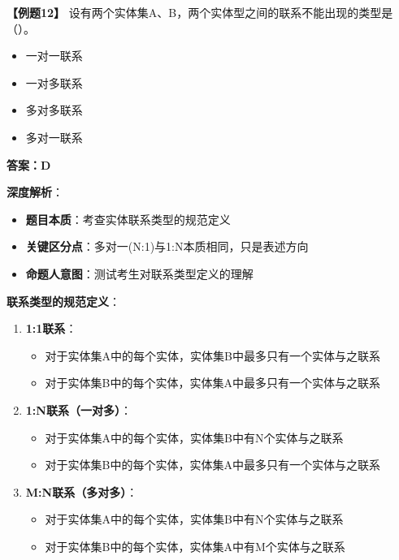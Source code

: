 \documentclass[12pt, a4paper]{article}
\newenvironment{bluebox}[1]{%
  \begin{trivlist}
  \item[\hskip\labelsep \textbf{#1}]
  \setlength{\parskip}{0.5ex}
  \setlength{\itemsep}{0.5ex}
}{%
  \end{trivlist}
  }
\begin{document}
\begin{bluebox}{例题12：不存在联系类型}
	\textbf{【例题12】} 设有两个实体集A、B，两个实体型之间的联系不能出现的类型是（\quad）。

	\begin{itemize}
		\item[A)] 一对一联系
		\item[B)] 一对多联系
		\item[C)] 多对多联系
		\item[D)] 多对一联系
	\end{itemize}

	\textbf{答案：D}

	\textbf{深度解析}：

	\begin{itemize}[leftmargin=*, nosep]
		\item \textbf{题目本质}：考查实体联系类型的规范定义
		\item \textbf{关键区分点}：多对一(N:1)与1:N本质相同，只是表述方向
		\item \textbf{命题人意图}：测试考生对联系类型定义的理解
	\end{itemize}

	\textbf{联系类型的规范定义}：

	\begin{enumerate}[leftmargin=*, nosep]
		\item \textbf{1:1联系}：
		      \begin{itemize}[nosep]
			      \item 对于实体集A中的每个实体，实体集B中最多只有一个实体与之联系
			      \item 对于实体集B中的每个实体，实体集A中最多只有一个实体与之联系
		      \end{itemize}

		\item \textbf{1:N联系（一对多）}：
		      \begin{itemize}[nosep]
			      \item 对于实体集A中的每个实体，实体集B中有N个实体与之联系
			      \item 对于实体集B中的每个实体，实体集A中最多只有一个实体与之联系
		      \end{itemize}

		\item \textbf{M:N联系（多对多）}：
		      \begin{itemize}[nosep]
			      \item 对于实体集A中的每个实体，实体集B中有N个实体与之联系
			      \item 对于实体集B中的每个实体，实体集A中有M个实体与之联系
		      \end{itemize}
	\end{enumerate}


\end{bluebox}
\end{document}
